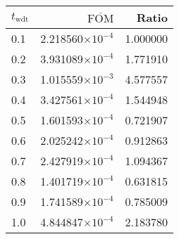 \begin{tabular}{lrr}
\toprule
$t_{\mathrm{wdt}}$ & $\overline{\mathrm{FOM}}$ &    Ratio \\
\midrule
               0.1 &  2.218560$\times 10^{-4}$ & 1.000000 \\
               0.2 &  3.931089$\times 10^{-4}$ & 1.771910 \\
               0.3 &  1.015559$\times 10^{-3}$ & 4.577557 \\
               0.4 &  3.427561$\times 10^{-4}$ & 1.544948 \\
               0.5 &  1.601593$\times 10^{-4}$ & 0.721907 \\
               0.6 &  2.025242$\times 10^{-4}$ & 0.912863 \\
               0.7 &  2.427919$\times 10^{-4}$ & 1.094367 \\
               0.8 &  1.401719$\times 10^{-4}$ & 0.631815 \\
               0.9 &  1.741589$\times 10^{-4}$ & 0.785009 \\
               1.0 &  4.844847$\times 10^{-4}$ & 2.183780 \\
\bottomrule
\end{tabular}
